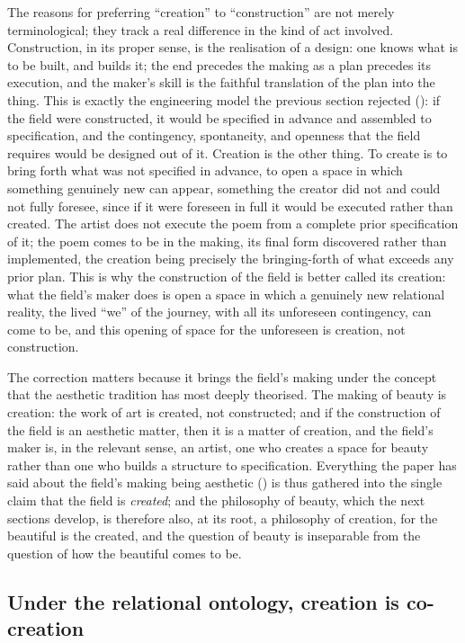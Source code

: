 The reasons for preferring ``creation'' to ``construction'' are not merely terminological; they track a real difference in the kind of act involved. Construction, in its proper sense, is the realisation of a design: one knows what is to be built, and builds it; the end precedes the making as a plan precedes its execution, and the maker's skill is the faithful translation of the plan into the thing. This is exactly the engineering model the previous section rejected (): if the field were constructed, it would be specified in advance and assembled to specification, and the contingency, spontaneity, and openness that the field requires would be designed out of it. Creation is the other thing. To create is to bring forth what was not specified in advance, to open a space in which something genuinely new can appear, something the creator did not and could not fully foresee, since if it were foreseen in full it would be executed rather than created. The artist does not execute the poem from a complete prior specification of it; the poem comes to be in the making, its final form discovered rather than implemented, the creation being precisely the bringing-forth of what exceeds any prior plan. This is why the construction of the field is better called its creation: what the field's maker does is open a space in which a genuinely new relational reality, the lived ``we'' of the journey, with all its unforeseen contingency, can come to be, and this opening of space for the unforeseen is creation, not construction.

The correction matters because it brings the field's making under the concept that the aesthetic tradition has most deeply theorised. The making of beauty is creation: the work of art is created, not constructed; and if the construction of the field is an aesthetic matter, then it is a matter of creation, and the field's maker is, in the relevant sense, an artist, one who creates a space for beauty rather than one who builds a structure to specification. Everything the paper has said about the field's making being aesthetic () is thus gathered into the single claim that the field is \emph{created}; and the philosophy of beauty, which the next sections develop, is therefore also, at its root, a philosophy of creation, for the beautiful is the created, and the question of beauty is inseparable from the question of how the beautiful comes to be.

\subsection{Under the relational ontology, creation is co-creation}
\label{p21:sub:cr-cocreation}

